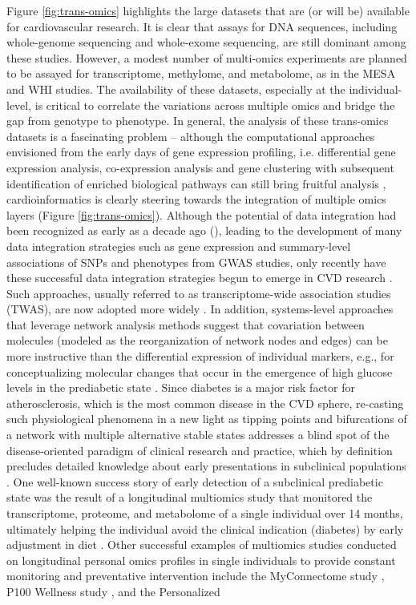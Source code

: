 \documentclass[letter]{bib}
\newcounter{example}[subsection]
\begin{document}
	 Figure \ref{fig:trans-omics} highlights the large datasets that are (or will be) available for cardiovascular research. It is clear that assays for DNA sequences, including whole-genome sequencing and whole-exome sequencing, are still dominant among these studies. However, a modest number of multi-omics experiments are planned to be assayed for transcriptome, methylome, and metabolome, as in the MESA and WHI studies. The availability of these datasets, especially at the individual-level, is critical to correlate the variations across multiple omics and bridge the gap from genotype to phenotype.  In general, the analysis of these trans-omics datasets is a fascinating problem -- although the computational approaches envisioned from the early days of gene expression profiling, i.e. differential gene expression analysis, co-expression analysis and gene clustering with subsequent identification of enriched biological pathways \citep{Claverie:1999:Computational} can still bring fruitful analysis \citep{Santolini:2018:personalized}, cardioinformatics is clearly steering towards the integration of multiple omics layers (Figure \ref{fig:trans-omics}). Although the potential of data integration had been recognized as early as a decade ago (\citep{Hawkins:2010:Nextgeneration}), leading to the development of many data integration strategies \citep{Ritchie:2015:Methods} such as gene expression and summary-level associations of SNPs and phenotypes from GWAS studies, only recently have these successful data integration strategies begun to emerge in CVD research \citep{Gusev:2016:Integrative}. Such approaches, usually referred to as transcriptome-wide association studies (TWAS), are now adopted more widely \citep{Klarin:2018:Genetics}.  In addition, systems-level approaches that leverage network analysis methods suggest that covariation between molecules (modeled as the reorganization of network nodes and edges) can be more instructive than the differential expression of individual markers, e.g., for conceptualizing molecular changes that occur in the emergence of high glucose levels in the prediabetic state \citep{Trachana:2018:Taking,Lau:2018:Omics}.  Since diabetes is a major risk factor for atherosclerosis, which is the most common disease in the CVD sphere, re-casting such physiological phenomena in a new light as tipping points and bifurcations of a network with multiple alternative stable states addresses a blind spot of the disease-oriented paradigm of clinical research and practice, which by definition precludes detailed knowledge about early presentations in subclinical populations \citep{Lau:2018:Omics}.  One well-known success story of early detection of a subclinical prediabetic state was the result of a longitudinal multiomics study that monitored the transcriptome, proteome, and metabolome of a single individual over 14 months, ultimately helping the individual avoid the clinical indication (diabetes) by early adjustment in diet \citep{Chen:2012:Personal}.  Other successful examples of multiomics studies conducted on longitudinal personal omics profiles in single individuals to provide constant monitoring and preventative intervention include the MyConnectome study \citep{Poldrack:2015:Long-term}, P100 Wellness study \citep{Price:2017:Wellness}, and the Personalized 
\end{document}

